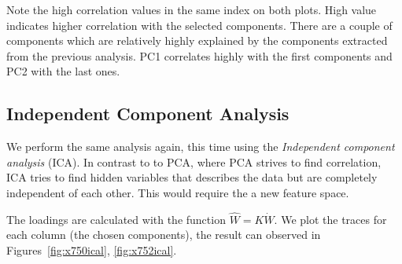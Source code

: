 \documentclass[a4paper,12pt]{article}
\begin{document}
        Note the high correlation values in the same index on both plots. High value indicates higher correlation with the selected components. There are a couple of components which are relatively highly explained by the components extracted from the previous analysis. PC1 correlates highly with the first components and PC2 with the last ones. 


    \subsection*{Independent Component Analysis}

        We perform the same analysis again, this time using the \emph{Independent component analysis} (ICA). In contrast to to PCA, where PCA strives to find correlation, ICA tries to find hidden variables that describes the data but are completely independent of each other. This would require the a new feature space. 

        The loadings are calculated with the function \( \hat{W} = K \dot W \). We plot the traces for each column (the chosen components), the result can observed in Figures~\ref{fig:x750ical}, \ref{fig:x752ical}.
        
\end{document}
